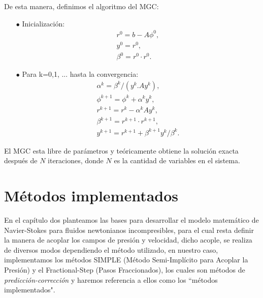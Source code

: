 \documentclass[a4paper,10pt, oneside]{book}
\begin{document}
De esta manera, definimos el algoritmo del MGC:

\begin{itemize}
	\item[$\bullet$] Inicialización:
			\begin{eqnarray}
				r^0 = b - A \phi^0 , \nonumber \\
				y^0 = r^0 , \nonumber \\
				\beta^0 = r^0 \cdot r^0 . \nonumber
			\end{eqnarray}
	
	\item[$\bullet$] Para k=0,1, ... hasta la convergencia:
			\begin{eqnarray}
				\alpha^k = \beta^k / (y^k . A y^k), \nonumber \\
				\phi^{k+1} = \phi^k + \alpha^k y^k, \nonumber \\
				r^{k+1} = r^k - \alpha^k A y^k, \nonumber \\
				\beta^{k+1} = r^{k+1} \cdot r^{k+1}, \nonumber \\
				y^{k+1} = r^{k+1} + \beta^{k+1} y^k / \beta^k. \nonumber
			\end{eqnarray}
\end{itemize}

El MGC esta libre de parámetros y teóricamente obtiene la solución exacta después de $N$ iteraciones, donde $N$ es la cantidad de variables en el sistema. 


\chapter{Métodos implementados}

En el capítulo dos planteamos las bases para desarrollar el modelo matemático de Navier-Stokes para fluidos newtonianos incompresibles, para el cual resta definir la manera de acoplar los campos de presión y velocidad, dicho acople, se realiza de diversos modos dependiendo el método utilizado, en nuestro caso, implementamos los métodos SIMPLE (Método Semi-Implícito para Acoplar la Presión) y el Fractional-Step (Pasos Fraccionados), los cuales son métodos de \textit{predicción-corrección} y haremos referencia a ellos como los ``métodos implementados".
\end{document}
